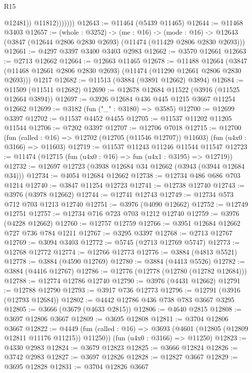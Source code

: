 \begin{lexlean}{R15}
\begin{coremodule}
                      @12481))
                  @11812)))))))
@12643 := @11464 (@5439 @11465)
@12644 := @11468 @3403
@12657 := (whole : @3252) ->
  (me : @16) ->
  (mode : @16) -> @12643 (@3847 (@12644 @2806 @2830 @2693) (@11474 (@11429 @2806 @2830 @2693)))
@12661 := @4297 @3397 @3400 @3403 @2983
@12662 := @3570 @12661
@12663 := @2713 @12662
@12664 := @12663 @11465
@12678 := @11488
    @12664
    (@3847 (@11468 @12661 @2806 @2830 @2693) (@11474 (@11290 @12661 @2806 @2830 @2693)))
    @1217
@12682 := @11513 (@3884 (@3891 @12662) @3894)
@12684 := @11509 (@11511 @12682)
@12690 := @12678 @12684 @11522 (@3916 (@11525 @12664 @3894))
@12697 := @3926 @12684 @436 @445 @1215 @3667 @11254 @12662
@12699 := @3182 (fun ("_" : @3180) => @3585)
@12700 := @12699 @3397
@12702 := @11537 @4452 @4455
@12705 := @11537 @11202 @11205 @11544
@12706 := @7202 @3397
@12707 := @12706 @7018
@12715 := @12700
    (fun (called : @16) => @12702 (@12705 (@11546 @12707)) @11603)
    (fun (u4x0 : @3166) => @11603)
@12719 := @11537 @11243 @11246 @11544 @11547
@12723 := @11474 (@12715 (fun (u4x0 : @16) => fun (u4x1 : @3195) => @12719))
@12732 := @12697 @12723 (@3938 @12684 @34 @12662 (@3943 (@3944 @12684 @34)))
@12734 := @4054 @12684 @12662
@12738 := @12734 @486 @686 @703 @1214
@12740 := @3847 @11254 @12723
@12741 := @12738 @12740
@12743 := @3976 (@3978 @12662)
@12744 := @12741 @12743
@12749 := @12734 @573 @712 @703 @1213 @12740
@12751 := @3976 (@4090 @12662)
@12752 := @12749 @12751
@12757 := @12734 @716 @723 @703 @1212 @12740
@12759 := @3976 (@4228 @12662)
@12760 := @12757 @12759
@12766 := @3951 @12684 @12662 @727 @736 @784 @1211
@12767 := @3295 @3397
@12768 := @2713 @12767
@12769 := @3094 @3403
@12772 := @5745 (@2713 @12769 @5747)
@12773 := @12768 @12772
@12774 := @12766 @12773
@12776 := @3884 (@4813 @5521)
@12778 := @3884 (@4590 @12769)
@12780 := @3884 (@4413 @5526)
@12782 := @3884 (@4416 @12767)
@12786 := @12776 (@12778 (@12780 (@12782 @12684)))
@12788 := @12774 @12786 @12740
@12790 := @3976 (@4431 @12662)
@12791 := @12788 @12790
@12793 := @3917 @736 @12773
@12796 := @12791 (@3916 (@12793 @12684))
@12802 := @4442 @12786 @436 @738 @783 @3667 @3295
@12805 := @3666 (@3679 (@4633 @2815))
@12806 := @4640 @2815
@12808 := @3697 @12806 @3667
@12809 := @3695 @12808
@12811 := @3704 @12806 @3667
@12822 := @4449
    (fun (called : @16) => @3693 (@4601 (@12805 (@12809 @12811 @11176 @11215)) @11250))
    (fun (u4x0 : @3166) => @11250)
@12823 := @4330 @2983
@12824 := @3679 @12823
@12825 := @3666 @12824
@12826 := @3742 @2983
@12827 := @3697 @12826
@12828 := @12827 @3667
@12829 := @3695 @12828
@12831 := @3704 @12826 @3667

\end{coremodule}
\end{lexlean}
